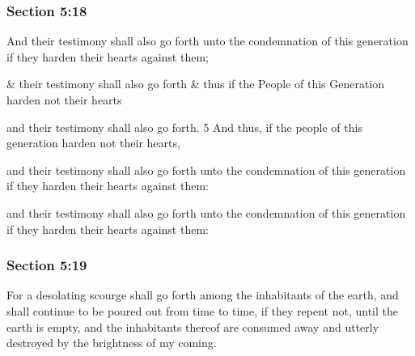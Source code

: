 	\subsubsection{Section 5:18} %
		\label{DC5-18}

		And their testimony shall also go forth unto the condemnation of this generation if they harden their hearts against them;

		\begin{framed}
		\scriptsize
			\begin{compactdesc}
				\item[JSP] \& their testimony shall also go forth \& thus if the People of this Generation harden not their hearts
				\item[RB1] [\textit{missing}]
				\item[BC] and their testimony shall also go forth. 5 And thus, if the people of this generation harden not their hearts,
				\item[DC 1835] and their testimony shall also go forth unto the condemnation of this generation if they harden their hearts against them:
				\item[DC 1844] and their testimony shall also go forth unto the condemnation of this generation if they harden their hearts against them:
			\end{compactdesc}
		\end{framed}

	\subsubsection{Section 5:19} %
		\label{DC5-19}

		For a desolating scourge shall go forth among the inhabitants of the earth, and shall continue to be poured out from time to time, if they repent not, until the earth is empty, and the inhabitants thereof are consumed away and utterly destroyed by the brightness of my coming.

